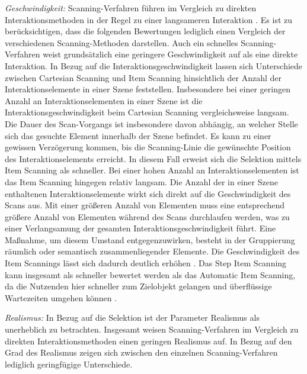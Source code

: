 \textit{Geschwindigkeit:}
Scanning-Verfahren führen im Vergleich zu direkten Interaktionsmethoden in der Regel zu einer langsameren Interaktion \citep{COOK2015117}. Es ist zu berücksichtigen, dass die folgenden Bewertungen lediglich einen Vergleich der verschiedenen Scanning-Methoden darstellen. Auch ein schnelles Scanning-Verfahren weist grundsätzlich eine geringere Geschwindigkeit auf als eine direkte Interaktion.
In Bezug auf die Interaktionsgeschwindigkeit lassen sich Unterschiede zwischen Cartesian Scanning und Item Scanning hinsichtlich der Anzahl der Interaktionselemente in einer Szene feststellen. Insbesondere bei einer geringen Anzahl an Interaktionselementen in einer Szene ist die Interaktionsgeschwindigkeit beim Cartesian Scanning vergleichsweise langsam. Die Dauer des Scan-Vorgangs ist insbesondere davon abhängig, an welcher Stelle sich das gesuchte Element innerhalb der Szene befindet. Es kann zu einer gewissen Verzögerung kommen, bis die Scanning-Linie die gewünschte Position des Interaktionselements erreicht. In diesem Fall erweist sich die Selektion mittels Item Scanning als schneller. Bei einer hohen Anzahl an Interaktionselementen ist das Item Scanning hingegen relativ langsam.  Die Anzahl der in einer Szene enthaltenen Interaktionselemente wirkt sich direkt auf die Geschwindigkeit des Scans aus. Mit einer größeren Anzahl von Elementen muss eine entsprechend größere Anzahl von Elementen während des Scans durchlaufen werden, was zu einer Verlangsamung der gesamten Interaktionsgeschwindigkeit führt. Eine Maßnahme, um diesem Umstand entgegenzuwirken, besteht in der Gruppierung räumlich oder semantisch zusammenliegender Elemente. Die Geschwindigkeit des Item Scannings lässt sich dadurch deutlich erhöhen \citep{COOK2015117}. Das Step Item Scanning kann insgesamt als schneller bewertet werden als das Automatic Item Scanning, da die Nutzenden hier schneller zum Zielobjekt gelangen und überflüssige Wartezeiten umgehen können \citep{COOK2015117}.  

\textit{Realismus:} In Bezug auf die Selektion ist der Parameter Realismus als unerheblich zu betrachten. Insgesamt weisen Scanning-Verfahren im Vergleich zu direkten Interaktionsmethoden einen geringen Realismus auf. In Bezug auf den Grad des Realismus zeigen sich zwischen den einzelnen Scanning-Verfahren lediglich geringfügige Unterschiede. 

